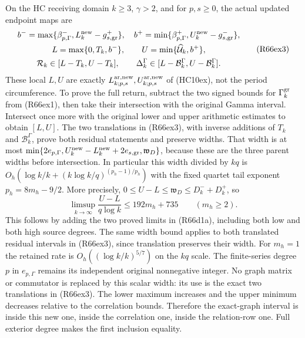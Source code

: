 On the HC receiving domain $k\geq3$, $\gamma>2$, and for
$p,s\geq0$, the actual updated endpoint maps are
\[
\begin{gathered}
 b^-=\max\{\beta_{p,\Gamma}^-,L_k^{\rm new}-g_{s,\rm gr}^+\},
 \quad b^+=\min\{\beta_{p,\Gamma}^+,U_k^{\rm new}-g_{s,\rm gr}^-\},\\
 L=\max\{0,T_k,b^-\},\qquad U=\min\{\widehat{\mathcal U}_k,b^+\},\\
 \mathcal R_k\in[L-T_k,U-T_k],\qquad
 \Delta_k^\Gamma\in[L-\mathcal B_k^\Gamma,U-\mathcal B_k^\Gamma].
\end{gathered}\tag{R66ex3}
\]
These local $L,U$ are exactly
$L_{k;p,s}^{\rm ar,new},U_{k;p,s}^{\rm ar,new}$ of (HC10ex),
not the period circumference. To prove the full return,
subtract the two signed bounds for $\Gamma_k^{\rm gr}$ from
(R66ex1), then take their intersection with the original Gamma
interval. Intersect once more with the original lower and
upper arithmetic estimates to obtain $[L,U]$.
The two translations in (R66ex3), with inverse additions
of $T_k$ and $\mathcal B_k^\Gamma$, prove both residual
statements and preserve widths. That width is at most
$\min\{2e_{p,\Gamma},U_k^{\rm new}-L_k^{\rm new}
+2e_{s,\rm gr},\mathfrak w_D\}$,
because these are the three parent widths before intersection.
In particular this width divided by $kq$ is
$O_h(\log k/k+(k\log k/q)^{(p_h-1)/p_h})$ with the fixed
quartet tail exponent $p_h=8m_h-9/2$. More precisely,
$0\leq U-L\leq\mathfrak w_D\leq D_k^-+D_k^+$, so
\[
 \limsup_{k\to\infty}\frac{U-L}{q\log k}
 \leq192m_h+735\qquad(m_h\geq2).
 \tag{R66ex3a}
\]
This follows by adding the two proved limits in (R66d1a),
including both low and both high source degrees. The same
width bound applies to both translated residual intervals
in (R66ex3), since translation preserves their width.
For $m_h=1$ the retained rate is
$O_h((\log k/k)^{5/7})$ on the $kq$ scale. The finite-series
degree $p$ in $e_{p,\Gamma}$ remains its independent original
nonnegative integer.
No graph matrix or commutator is replaced by this scalar
width: its use is the exact two translations in (R66ex3).
The lower maximum increases and the upper minimum decreases
relative to the correlation bounds. Therefore the exact-graph
interval is inside this new one, inside the correlation one,
inside the relation-row one. Full exterior degree makes the
first inclusion equality.

